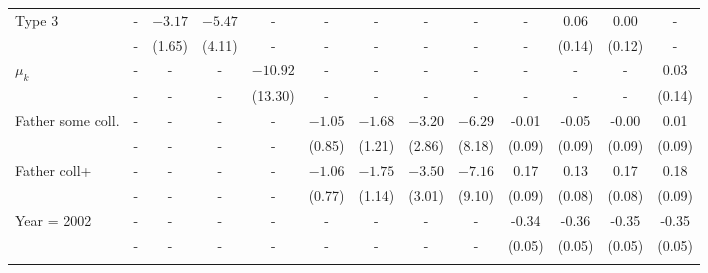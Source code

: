 \begin{tabular}{lcccccccccccc}
Type 3&-&$-3.17$&$-5.47$&-&-&-&-&-&-&0.06&0.00&-\\
&-&(1.65)&(4.11)&-&-&-&-&-&-&(0.14)&(0.12)&-\\
$\mu_{k}$&-&-&-&$-10.92$&-&-&-&-&-&-&-&0.03\\
&-&-&-&(13.30)&-&-&-&-&-&-&-&(0.14)\\
Father some coll.&-&-&-&-&$-1.05$&$-1.68$&$-3.20$&$-6.29$&-0.01&-0.05&-0.00&0.01\\
&-&-&-&-&(0.85)&(1.21)&(2.86)&(8.18)&(0.09)&(0.09)&(0.09)&(0.09)\\
Father coll+&-&-&-&-&$-1.06$&$-1.75$&$-3.50$&$-7.16$&0.17&0.13&0.17&0.18\\
&-&-&-&-&(0.77)&(1.14)&(3.01)&(9.10)&(0.09)&(0.08)&(0.08)&(0.09)\\
Year = 2002&-&-&-&-&-&-&-&-&-0.34&-0.36&-0.35&-0.35\\
&-&-&-&-&-&-&-&-&(0.05)&(0.05)&(0.05)&(0.05)\\
\\
\bottomrule\end{tabular}